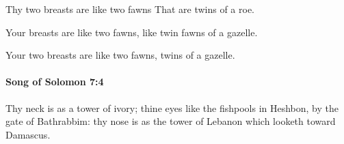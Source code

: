 			\begin{versebox}
					\item[BHS] 
					\item[LXX] 
					\item[ASV] Thy two breasts are like two fawns That are twins of a roe.
					\item[NIV] Your breasts are like two fawns, like twin fawns of a gazelle.
					\item[NRSV] Your two breasts are like two fawns, twins of a gazelle.
			\end{versebox}

		\paragraph{Song of Solomon 7:4} %
			\label{SONGOFSOLOMON-7-4}

			Thy neck is as a tower of ivory; thine eyes like the fishpools in Heshbon, by the gate of Bathrabbim: thy nose is as the tower of Lebanon which looketh toward Damascus.

